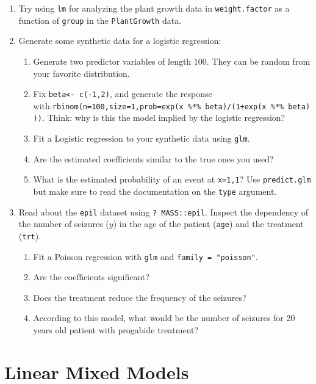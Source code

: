 \documentclass[]{book}
\providecommand{\tightlist}{%
  \setlength{\itemsep}{0pt}\setlength{\parskip}{0pt}}
\theoremstyle{definition}
\theoremstyle{definition}
\theoremstyle{definition}
\theoremstyle{remark}
\begin{document}
\begin{enumerate}
\def\labelenumi{\arabic{enumi}.}
\item
  Try using \texttt{lm} for analyzing the plant growth data in
  \texttt{weight.factor} as a function of \texttt{group} in the
  \texttt{PlantGrowth} data.
\item
  Generate some synthetic data for a logistic regression:

  \begin{enumerate}
  \def\labelenumii{\alph{enumii}.}
  \tightlist
  \item
    Generate two predictor variables of length \(100\). They can be
    random from your favorite distribution.
  \item
    Fix \texttt{beta\textless{}-\ c(-1,2)}, and generate the response
    with:\texttt{rbinom(n=100,size=1,prob=exp(x\ \%*\%\ beta)/(1+exp(x\ \%*\%\ beta)))}.
    Think: why is this the model implied by the logistic regression?
  \item
    Fit a Logistic regression to your synthetic data using \texttt{glm}.
  \item
    Are the estimated coefficients similar to the true ones you used?
  \item
    What is the estimated probability of an event at \texttt{x=1,1}? Use
    \texttt{predict.glm} but make sure to read the documentation on the
    \texttt{type} argument.
  \end{enumerate}
\item
  Read about the \texttt{epil} dataset using \texttt{?\ MASS::epil}.
  Inspect the dependency of the number of seizures (\(y\)) in the age of
  the patient (\texttt{age}) and the treatment (\texttt{trt}).

  \begin{enumerate}
  \def\labelenumii{\arabic{enumii}.}
  \tightlist
  \item
    Fit a Poisson regression with \texttt{glm} and
    \texttt{family\ =\ "poisson"}.
  \item
    Are the coefficients significant?\\
  \item
    Does the treatment reduce the frequency of the seizures?
  \item
    According to this model, what would be the number of seizures for 20
    years old patient with progabide treatment?
  \end{enumerate}
\end{enumerate}

\chapter{Linear Mixed Models}\label{lme}
\end{document}

